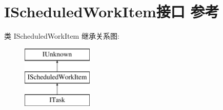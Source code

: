\hypertarget{interface_i_scheduled_work_item}{}\section{I\+Scheduled\+Work\+Item接口 参考}
\label{interface_i_scheduled_work_item}
类 I\+Scheduled\+Work\+Item 继承关系图\+:\begin{figure}[H]
\begin{center}
\leavevmode
\includegraphics[height=3.000000cm]{interface_i_scheduled_work_item}
\end{center}
\end{figure}
